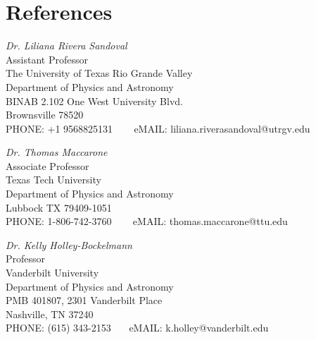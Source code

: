 \documentclass[letterpaper,10pt]{article}
\begin{document}
\pagebreak


\section*{References }  


   \begin{tabbing}
 \emph{Dr. Liliana Rivera Sandoval}\\
Assistant Professor \\
The University of Texas Rio Grande Valley \\
Department of Physics and Astronomy \\
BINAB 2.102 One West University Blvd. \\
Brownsville 78520 \\
PHONE:  +1 9568825131 \,\,\,\,\,\,\,\,\, eMAIL: 
liliana.riverasandoval@utrgv.edu
\end{tabbing}



   \begin{tabbing}
 \emph{Dr. Thomas Maccarone}\\
Associate Professor\\
Texas Tech University \\
Department of Physics and Astronomy \\
Lubbock TX 79409-1051 \\
PHONE:  1-806-742-3760 \,\,\,\,\,\,\,\,\, eMAIL: 
thomas.maccarone@ttu.edu
\end{tabbing}





   \begin{tabbing}
 \emph{Dr. Kelly Holley-Bockelmann}\\
Professor \\
Vanderbilt University \\
Department of Physics and Astronomy \\
 PMB 401807, 2301 Vanderbilt Place \\
  Nashville, TN 37240\\
PHONE:  (615) 343-2153\,\,\,\,\,\,\,\,\, eMAIL: 
 k.holley@vanderbilt.edu
\end{tabbing}



\end{document}
